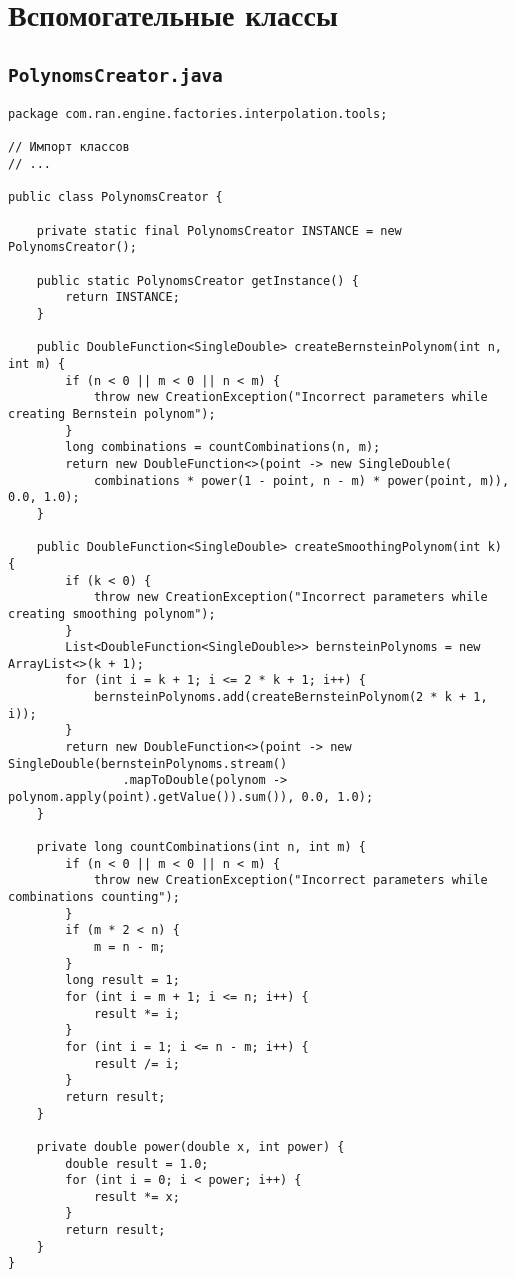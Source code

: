 \chapter{Вспомогательные классы}

\section*{\texttt{PolynomsCreator.java}}
\begin{verbatim}
package com.ran.engine.factories.interpolation.tools;

// Импорт классов
// ...

public class PolynomsCreator {

    private static final PolynomsCreator INSTANCE = new PolynomsCreator();

    public static PolynomsCreator getInstance() {
        return INSTANCE;
    }

    public DoubleFunction<SingleDouble> createBernsteinPolynom(int n, int m) {
        if (n < 0 || m < 0 || n < m) {
            throw new CreationException("Incorrect parameters while creating Bernstein polynom");
        }
        long combinations = countCombinations(n, m);
        return new DoubleFunction<>(point -> new SingleDouble(
            combinations * power(1 - point, n - m) * power(point, m)), 0.0, 1.0);
    }

    public DoubleFunction<SingleDouble> createSmoothingPolynom(int k) {
        if (k < 0) {
            throw new CreationException("Incorrect parameters while creating smoothing polynom");
        }
        List<DoubleFunction<SingleDouble>> bernsteinPolynoms = new ArrayList<>(k + 1);
        for (int i = k + 1; i <= 2 * k + 1; i++) {
            bernsteinPolynoms.add(createBernsteinPolynom(2 * k + 1, i));
        }
        return new DoubleFunction<>(point -> new SingleDouble(bernsteinPolynoms.stream()
                .mapToDouble(polynom -> polynom.apply(point).getValue()).sum()), 0.0, 1.0);
    }

    private long countCombinations(int n, int m) {
        if (n < 0 || m < 0 || n < m) {
            throw new CreationException("Incorrect parameters while combinations counting");
        }
        if (m * 2 < n) {
            m = n - m;
        }
        long result = 1;
        for (int i = m + 1; i <= n; i++) {
            result *= i;
        }
        for (int i = 1; i <= n - m; i++) {
            result /= i;
        }
        return result;
    }

    private double power(double x, int power) {
        double result = 1.0;
        for (int i = 0; i < power; i++) {
            result *= x;
        }
        return result;
    }
}
\end{verbatim}

